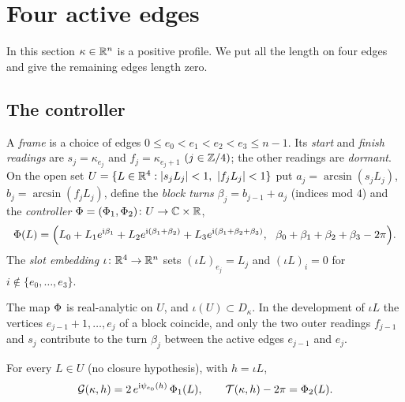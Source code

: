\section{Four active edges}\label{sec:anchor}

In this section $\kappa\in\mathbb{R}^n$ is a positive profile. We put all the length
on four edges and give the remaining edges length zero.

\subsection{The controller}

\begin{definition}\label{def:frame}
A \emph{frame} is a choice of edges $0\le e_0<e_1<e_2<e_3\le n-1$. Its
\emph{start} and \emph{finish readings} are
$s_j=\kappa_{e_j}$ and $f_j=\kappa_{e_j+1}$ $(j\in\mathbb{Z}/4)$; the other readings
are \emph{dormant}. On the open set
$U=\{L\in\R^4:|s_jL_j|<1,\ |f_jL_j|<1\}$ put
$a_j=\arcsin(s_jL_j)$, $b_j=\arcsin(f_jL_j)$, define the \emph{block turns}
$\beta_j=b_{j-1}+a_j$ (indices mod $4$) and the \emph{controller}
$\Phi=(\Phi_1,\Phi_2)\colon U\to\mathbb{C}\times\mathbb{R}$,
\begin{equation}\label{eq:controller}
  \Phi(L)=\Bigl(L_0+L_1e^{\mathrm{i}\beta_1}+L_2e^{\mathrm{i}(\beta_1+\beta_2)}
  +L_3e^{\mathrm{i}(\beta_1+\beta_2+\beta_3)},\ \
  \beta_0+\beta_1+\beta_2+\beta_3-2\pi\Bigr).
\end{equation}
The \emph{slot embedding} $\iota\colon\mathbb{R}^4\to\mathbb{R}^n$ sets $(\iota L)_{e_j}=L_j$
and $(\iota L)_i=0$ for $i\notin\{e_0,\dots,e_3\}$.
\end{definition}

The map $\Phi$ is real-analytic on $U$, and $\iota(U)\subset D_\kappa$. In
the development of $\iota L$ the vertices $e_{j-1}+1,\dots,e_j$ of a block
coincide, and only the two outer readings $f_{j-1}$ and $s_j$ contribute to
the turn $\beta_j$ between the active edges $e_{j-1}$ and $e_j$.

\begin{proposition}\label{prop:slot}
For every $L\in U$ \textup{(}no closure hypothesis\textup{)}, with $h=\iota L$,
\begin{equation}\label{eq:slot}
  \mathcal{G}(\kappa,h)=2\,e^{\mathrm{i}\psi_{e_0}(h)}\,\Phi_1(L),\qquad
  \mathcal{T}(\kappa,h)-2\pi=\Phi_2(L).
\end{equation}
\end{proposition}

